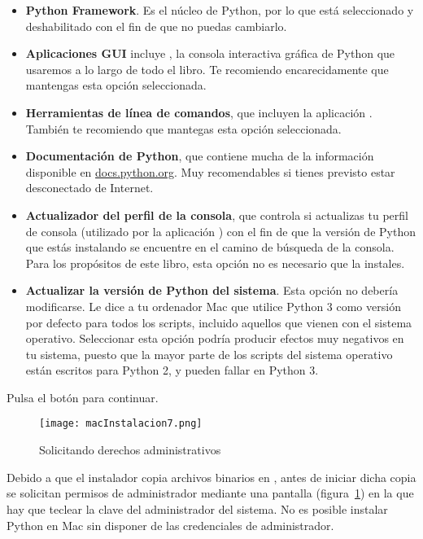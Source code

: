 \begin{itemize}
\item \textbf{Python Framework}. Es el núcleo de Python, por lo que está seleccionado y deshabilitado con el fin de que no puedas cambiarlo.
\item \textbf{Aplicaciones GUI} incluye , la consola interactiva gráfica de Python que usaremos a lo largo de todo el libro. Te recomiendo encarecidamente que mantengas esta opción seleccionada.
\item \textbf{Herramientas de línea de comandos}, que incluyen la aplicación . También te recomiendo que mantegas esta opción seleccionada.
\item \textbf{Documentación de Python}, que contiene mucha de la información disponible en \href{http://docs.python.org/}{docs.python.org}. Muy recomendables si tienes previsto estar desconectado de Internet.
\item \textbf{Actualizador del perfil de la consola}, que controla si actualizas tu perfil de consola (utilizado por la aplicación ) con el fin de que la versión de Python que estás instalando se encuentre en el camino de búsqueda de la consola. Para los propósitos de este libro, esta opción no es necesario que la instales.
\item \textbf{Actualizar la versión de Python del sistema}. Esta opción no debería modificarse. Le dice a tu ordenador Mac que utilice Python 3 como versión por defecto para todos los scripts, incluido aquellos que vienen con el sistema operativo. Seleccionar esta opción podría producir efectos muy negativos en tu sistema, puesto que la mayor parte de los scripts del sistema operativo están escritos para Python 2, y pueden fallar en Python 3.
\end{itemize}

Pulsa el botón  para continuar.

\begin{figure}[!h]
  \begin{center}
\texttt{[image: macInstalacion7.png]}
\caption{Solicitando derechos administrativos}\label{figm07}
  \end{center}
\end{figure}

Debido a que el instalador copia archivos binarios en , antes de iniciar dicha copia se solicitan permisos de administrador mediante una pantalla (figura~\ref{figm07}) en la que hay que teclear la clave del administrador del sistema. No es posible instalar Python en Mac sin disponer de las credenciales de administrador.

